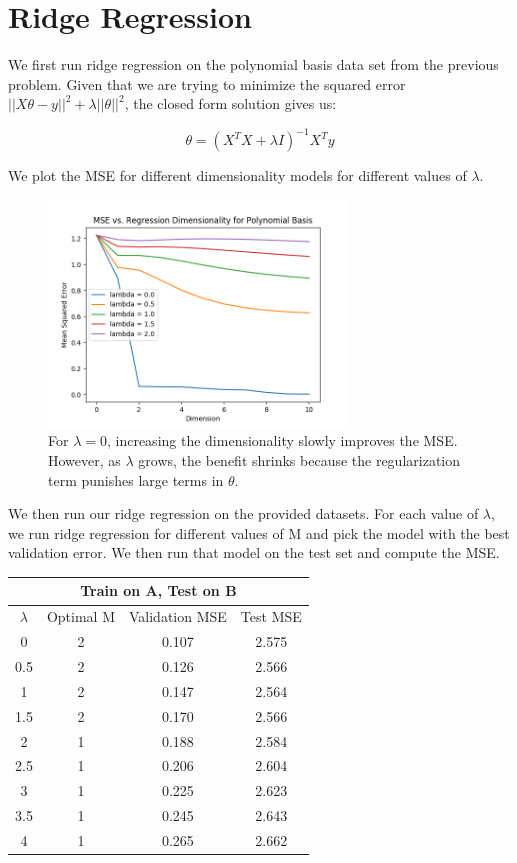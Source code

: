 \documentclass{article}
\begin{document}
\section{Ridge Regression}

We first run ridge regression on the polynomial basis data set from the previous problem. Given that we are trying to minimize the squared error  $\vert \vert X\theta - y\vert \vert ^2 + \lambda \vert \vert \theta \vert \vert ^2$, the closed form solution gives us:

\[  \theta = (X^{T}X + \lambda I)^{-1} X^{T} y \]

We plot the MSE for different dimensionality models for different values of $\lambda$.

\begin{figure}[H]
  \centering
  \includegraphics[width = 3.15in]{../P3/figs/poly_basis.png}
  \caption*{For $\lambda = 0$, increasing the dimensionality slowly improves the MSE. However, as $\lambda$ grows, the benefit shrinks because the regularization term punishes large terms in $\theta$.}
\end{figure}

We then run our ridge regression on the provided datasets. For each value of $\lambda$, we run ridge regression for different values of M and pick the model with the best validation error. We then run that model on the test set and compute the MSE.


\begin{center}
 \begin{tabular}{||c c c c||} 
 \hline
 \multicolumn{4}{|c|}{Train on A, Test on B} \\
 \hline
 \hline
 $\lambda$ & Optimal M & Validation MSE & Test MSE\\ [0.5ex] 
 \hline\hline
 0 & 2 & 0.107 & 2.575 \\ 
 \hline
 0.5 & 2 & 0.126 & 2.566 \\
 \hline
 1 & 2 & 0.147 & 2.564 \\
 \hline
 1.5 & 2 & 0.170 & 2.566 \\
 \hline
2 & 1 & 0.188 & 2.584 \\
 \hline
2.5 & 1 & 0.206 & 2.604 \\
 \hline
3 & 1 & 0.225 & 2.623 \\
 \hline
 3.5 & 1 & 0.245 & 2.643 \\
 \hline
4 & 1 & 0.265 & 2.662 \\
 \hline
\end{tabular}
\end{center}
\end{document}
